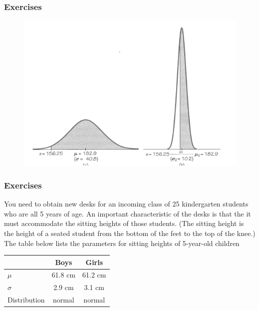 \documentclass[xcolor=dvipsnames]{beamer}
\begin{document}
\begin{frame}
  \frametitle{Exercises} 
\begin{figure}[h]
\includegraphics[scale=.75]{./diagrams/triola-281.png}
\end{figure}
\end{frame}

\begin{frame}
  \frametitle{Exercises} 
  {\ubung} You need to obtain new desks for an incoming class of 25
  kindergarten students who are all 5 years of age. An important
  characteristic of the desks is that the it must accommodate the
  sitting heights of those students. (The sitting height is the height
  of a seated student from the bottom of the feet to the top of the
  knee.) The table below lists the parameters for sitting heights of
  5-year-old children

\medskip

  \begin{tabular}{|l|c|c|}\hline
                 & Boys    & Girls   \\ \hline
    $\mu$        & 61.8 cm & 61.2 cm \\ \hline
    $\sigma$     & 2.9 cm  & 3.1 cm  \\ \hline 
    Distribution & normal  & normal  \\ \hline
  \end{tabular}
\end{frame}
\end{document}
